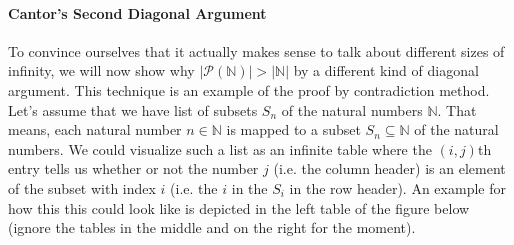 \paragraph{Cantor's Second Diagonal Argument} 
To convince ourselves that it actually makes sense to talk about different sizes of infinity, we will now show why $|\mathcal{P}(\mathbb{N})| > |\mathbb{N}|$ by a different kind of diagonal argument. This technique is an example of the proof by contradiction method. Let's assume that we have list of subsets $S_n$ of the natural numbers $\mathbb{N}$. That means, each natural number $n \in \mathbb{N}$ is mapped to a subset $S_n \subseteq \mathbb{N}$ of the natural numbers. We could visualize such a list as an infinite table where the $(i,j)$th entry tells us whether or not the number $j$ (i.e. the column header) is an element of the subset with index $i$ (i.e. the $i$ in the $S_i$ in the row header). An example for how this this could look like is depicted in the left table of the figure below (ignore the tables in the middle and on the right for the moment).
